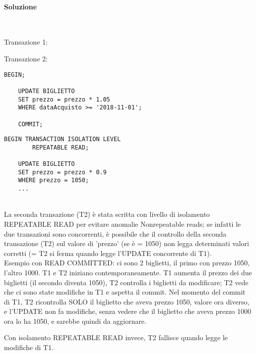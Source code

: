 \documentclass[a4paper, 10pt, titlepage]{article}
\begin{document}
\paragraph{Soluzione}\dotfill \\ 
\lstset{language=SQL}
\begin{minipage}{0.5\textwidth}
Transazione 1:
\end{minipage}
\begin{minipage}{0.5\textwidth}
Transazione 2:
\end{minipage}
\begin{footnotesize}
\begin{minipage}{0.5\textwidth}
\begin{lstlisting}[tabsize=2]
	BEGIN;

	UPDATE BIGLIETTO 
	SET prezzo = prezzo * 1.05
	WHERE dataAcquisto >= '2018-11-01';
	
	COMMIT;
\end{lstlisting}
\end{minipage}\vrule\hfill
\begin{minipage}{0.5\textwidth}
\begin{lstlisting}[tabsize=2]
	BEGIN TRANSACTION ISOLATION LEVEL 
		REPEATABLE READ;

	UPDATE BIGLIETTO 
	SET prezzo = prezzo * 0.9
	WHERE prezzo = 1050;
	...
\end{lstlisting}
\end{minipage}
\end{footnotesize}\medskip \\
La seconda transazione (T2) è stata scritta con livello di isolamento REPEATABLE READ per evitare anomalie Nonrepeatable reads; se infatti le due transazioni sono concorrenti, è possibile che il controllo della seconda transazione (T2) sul valore di 'prezzo' (se è = 1050) non legga determinati valori corretti (= T2 si ferma quando legge l'UPDATE concorrente di T1). \medskip \\
Esempio con READ COMMITTED: ci sono 2 biglietti, il primo con prezzo 1050, l'altro 1000. T1 e T2 iniziano contemporaneamente. 
T1 aumenta il prezzo dei due biglietti (il secondo diventa 1050), T2 controlla i biglietti da modificare; T2 vede che ci sono state modifiche in T1 e aspetta il commit. Nel momento del commit di T1, T2 ricontrolla SOLO il biglietto che aveva prezzo 1050, valore ora diverso, e l'UPDATE non fa modifiche, senza vedere che il biglietto che aveva prezzo 1000 ora lo ha 1050, e sarebbe quindi da aggiornare.

Con isolamento REPEATABLE READ invece, T2 fallisce quando legge le modifiche di T1.
\end{document}
